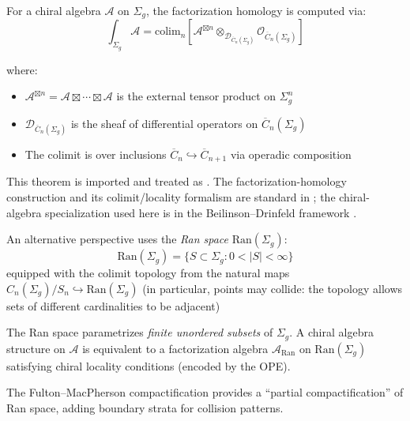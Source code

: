 \begin{theorem}\label{thm:fact-homology}
\label{thm:bar-factorization-homology}
For a chiral algebra $\mathcal{A}$ on $\Sigma_g$, the factorization homology is computed via:
\[\int_{\Sigma_g} \mathcal{A} = \text{colim}_n \left[ \mathcal{A}^{\boxtimes n} \otimes_{\mathcal{D}_{\overline{C}_n(\Sigma_g)}} \mathcal{O}_{\overline{C}_n(\Sigma_g)} \right]\]

where:
\begin{itemize}
\item $\mathcal{A}^{\boxtimes n} = \mathcal{A} \boxtimes \cdots \boxtimes \mathcal{A}$ is the external tensor product on $\Sigma_g^n$
\item $\mathcal{D}_{\overline{C}_n(\Sigma_g)}$ is the sheaf of differential operators on $\overline{C}_n(\Sigma_g)$
\item The colimit is over inclusions $\overline{C}_n \hookrightarrow \overline{C}_{n+1}$ via operadic composition
\end{itemize}
\end{theorem}

\begin{remark}
This theorem is imported and treated as \ClaimStatusProvedElsewhere. The
factorization-homology construction and its colimit/locality formalism are
standard in \cite{AF15,CG17}; the chiral-algebra specialization used here is in
the Beilinson--Drinfeld framework \cite[Chapter~3]{BD04}.
\end{remark}

\begin{remark}\label{rem:ran-space}
An alternative perspective uses the \emph{Ran space} $\text{Ran}(\Sigma_g)$:
\[\text{Ran}(\Sigma_g) = \{S \subset \Sigma_g : 0 < |S| < \infty\}\]
equipped with the colimit topology from the natural maps $C_n(\Sigma_g)/S_n \hookrightarrow \text{Ran}(\Sigma_g)$
(in particular, points may collide: the topology allows sets of different cardinalities to be adjacent)

The Ran space parametrizes \emph{finite unordered subsets} of $\Sigma_g$. A chiral algebra structure on $\mathcal{A}$ is equivalent to a factorization algebra $\mathcal{A}_{\text{Ran}}$ on $\text{Ran}(\Sigma_g)$ satisfying chiral locality conditions (encoded by the OPE).

The Fulton--MacPherson compactification provides a ``partial compactification'' of Ran space, adding boundary strata for collision patterns.
\end{remark}

